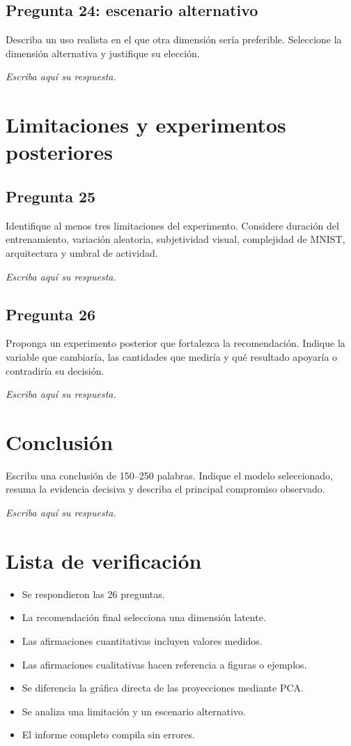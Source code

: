 \documentclass[11pt,letterpaper]{article}
\newcommand{\answerarea}[1][2.1cm]{%
\begin{responsebox}
\textit{Escriba aquí su respuesta.}
\vspace{#1}
\end{responsebox}
}
\begin{document}
\subsection*{Pregunta 24: escenario alternativo}
Describa un uso realista en el que otra dimensión sería preferible. Seleccione
la dimensión alternativa y justifique su elección.
\answerarea[3.5cm]

\section{Limitaciones y experimentos posteriores}

\subsection*{Pregunta 25}
Identifique al menos tres limitaciones del experimento. Considere duración del
entrenamiento, variación aleatoria, subjetividad visual, complejidad de MNIST,
arquitectura y umbral de actividad.
\answerarea[4.0cm]

\subsection*{Pregunta 26}
Proponga un experimento posterior que fortalezca la recomendación. Indique la
variable que cambiaría, las cantidades que mediría y qué resultado apoyaría o
contradiría su decisión.
\answerarea[4.0cm]

\section{Conclusión}

Escriba una conclusión de 150--250 palabras. Indique el modelo seleccionado,
resuma la evidencia decisiva y describa el principal compromiso observado.
\answerarea[4.0cm]

\section*{Lista de verificación}
\begin{itemize}[label=$\square$,leftmargin=*]
  \item Se respondieron las 26 preguntas.
  \item La recomendación final selecciona una dimensión latente.
  \item Las afirmaciones cuantitativas incluyen valores medidos.
  \item Las afirmaciones cualitativas hacen referencia a figuras o ejemplos.
  \item Se diferencia la gráfica directa de las proyecciones mediante PCA.
  \item Se analiza una limitación y un escenario alternativo.
  \item El informe completo compila sin errores.
\end{itemize}
\end{document}

